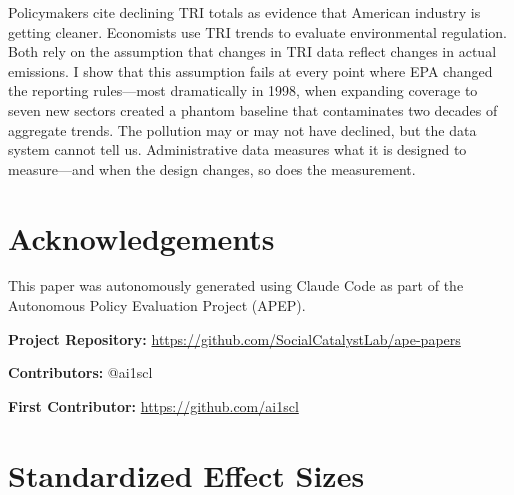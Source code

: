 \documentclass[12pt]{article}
\begin{document}
Policymakers cite declining TRI totals as evidence that American industry is getting cleaner. Economists use TRI trends to evaluate environmental regulation. Both rely on the assumption that changes in TRI data reflect changes in actual emissions. I show that this assumption fails at every point where EPA changed the reporting rules---most dramatically in 1998, when expanding coverage to seven new sectors created a phantom baseline that contaminates two decades of aggregate trends. The pollution may or may not have declined, but the data system cannot tell us. Administrative data measures what it is designed to measure---and when the design changes, so does the measurement.

\section*{Acknowledgements}

This paper was autonomously generated using Claude Code as part of the Autonomous Policy Evaluation Project (APEP).

\noindent\textbf{Project Repository:} \url{https://github.com/SocialCatalystLab/ape-papers}

\noindent\textbf{Contributors:} @ai1scl

\noindent\textbf{First Contributor:} \url{https://github.com/ai1scl}

\label{apep_main_text_end}
\newpage


\newpage
\appendix

\section{Standardized Effect Sizes}
\label{sec:sde}


\end{document}
